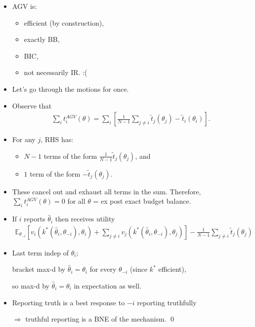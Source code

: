 \documentclass[english,handout]{beamer}		%
\def\lyxframeend{} %
\begin{document}
\begin{itemize}
	\item AGV is:
	\begin{itemize}
		\item efficient (by construction),
		\item exactly BB,
		\item BIC,
		\pause
		\item not necessarily IR. :(
	\end{itemize}
	\item Let's go through the motions for once.
\end{itemize}
\lyxframeend


\begin{itemize}
	\item Observe that
	\vspace{-0.5em}\begin{align*}
	\sum_i t_i^{AGV} (\theta) = \sum_i \left[ \frac{1}{N-1} \sum_{j \neq i} \tilde{t}_j (\theta_j) - \tilde{t}_i (\theta_i) \right].
	\end{align*}\vspace{-1em}
	\item For any $j$, RHS has:
	\begin{itemize}
		\item $N-1$ terms of the form $\frac{1}{N-1} \tilde{t}_j (\theta_j)$, and
		\item $1$ term of the form $-\tilde{t}_j(\theta_j)$.
	\end{itemize}
	\item These cancel out and exhaust all terms in the sum. Therefore, $\sum_i t_i^{AGV} (\theta) = 0$ for all $\theta$ = ex post exact budget balance.
\end{itemize}
\lyxframeend


\begin{itemize}
	\item If $i$ reports $\hat{\theta}_i$ then receives utility
	{\footnotesize 
		\vspace{-0.5em}\begin{align*}
		\mathbb{E}_{\theta_{-i}} \left[ v_i(k^*(\hat{\theta}_i, \theta_{-i}), \theta_i) + \sum_{j \neq i} v_j(k^*(\hat{\theta}_i, \theta_{-i}), \theta_j) \right] - \frac{1}{N-1} \sum_{j \neq i} \tilde{t}_j (\theta_j)
	 	\end{align*}\vspace{-1em}
	}
	\item Last term indep of $\hat{\theta}_i$; 
	
	bracket max-d by $\hat{\theta}_i = \theta_i$ for every $\theta_{-i}$ (since $k^*$ efficient), 
	
	so max-d by $\hat{\theta}_i = \theta_i$ in expectation as well.
	
	\item Reporting truth is a best response to $-i$ reporting truthfully 
	
	$\Rightarrow$ truthful reporting is a BNE of the mechanism. \qed
\end{itemize}
\lyxframeend
\end{document}
